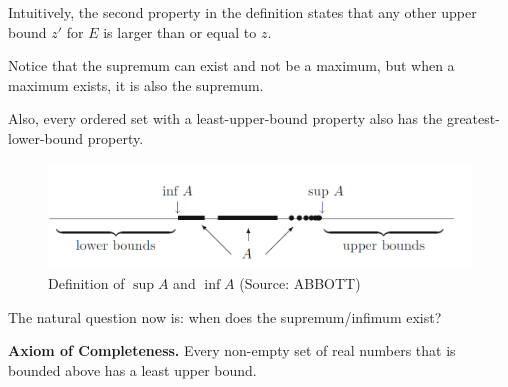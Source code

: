 \documentclass[12pt,a4paper]{article}
\theoremstyle{definition}
\newtheorem{theorem}{Theorem}[section]
\newtheorem{definition}{Definition}[section]
\begin{document}
Intuitively, the second property in the definition states that any other upper bound $z'$ for $E$ is larger than or equal to $z$.

Notice that the supremum can exist and not be a maximum, but when a maximum exists, it is also the supremum.

Also, every ordered set with a least-upper-bound property also has the greatest-lower-bound property.

\begin{figure}[h]
  \centering
  \includegraphics[width=\textwidth]{sup-inf}
  \caption{Definition of $\sup A$ and $\inf A$ (Source: ABBOTT)}
  \label{fig:sup-inf}
\end{figure}

%
%

The natural question now is: when does the supremum/infimum exist?

\textbf{Axiom of Completeness.} Every non-empty set of real numbers that is bounded above has a least upper bound.


%
\end{document}
